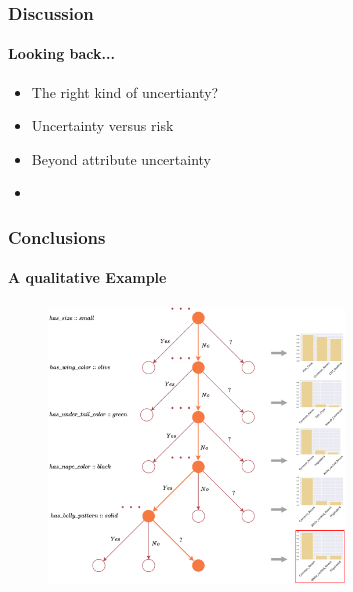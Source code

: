 \documentclass[9pt]{beamer}
\begin{document}
\begin{frame}
\frametitle{Discussion}
\framesubtitle{Looking back...}
\begin{itemize}
	\item The right kind of uncertianty?
	\item Uncertainty versus risk
	\item Beyond attribute uncertainty
	\item
\end{itemize}

\end{frame} 










\begin{frame}
\frametitle{Conclusions}
\framesubtitle{A qualitative Example}
\begin{figure}
	\centering
	\includegraphics[width=0.7\textwidth]{images/example_tree.pdf}
\label{fig:example_tree}
\end{figure}
\end{frame} 

\begin{frame}
	
	
\end{frame}
\end{document}
